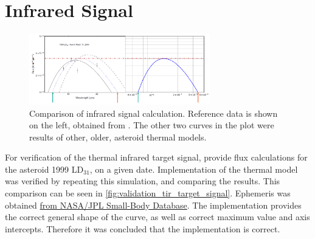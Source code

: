 \section{Infrared Signal}
\label{sec:vvinfrared}

\begin{figure}[htbp]
 \centering
 \includegraphics[width=0.7\textwidth]{img/validation_tir_target_signal.png}
 \caption{Comparison of infrared signal calculation. Reference data is shown on the left, obtained from \cite{AsteroidNEATM}. The other two curves in the plot were results of other, older, asteroid thermal models.}
 \label{fig:validation_tir_target_signal}
\end{figure}

For verification of the thermal infrared target signal, \cite{AsteroidNEATM} provide flux calculations for the asteroid 1999 LD$_{31}$, on a given date. Implementation of the thermal model was verified by repeating this simulation, and comparing the results. This comparison can be seen in \autoref{fig:validation_tir_target_signal}. Ephemeris was obtained \href{https://ssd.jpl.nasa.gov/tools/sbdb\_lookup.html#/?sstr=1999\%20LD31}{from NASA/JPL Small-Body Database}. The implementation provides the correct general shape of the curve, as well as correct maximum value and axis intercepts. Therefore it was concluded that the implementation is correct.\\

